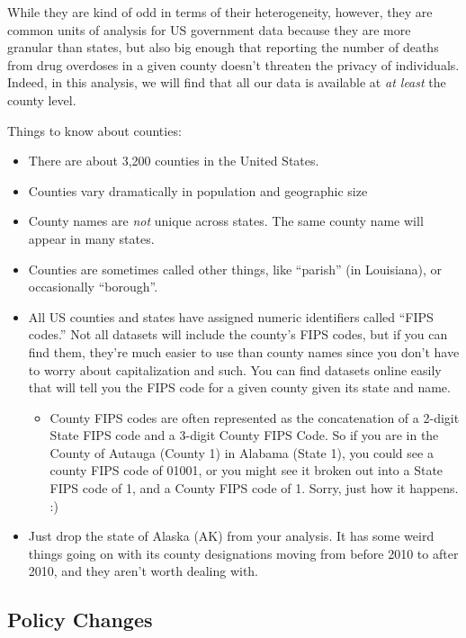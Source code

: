 \documentclass[12pt]{article}
\begin{document}
While they are kind of odd in terms of their heterogeneity, however, they are common units of analysis for US government data because they are more granular than states, but also big enough that reporting the number of deaths from drug overdoses in a given county doesn't threaten the privacy of individuals. Indeed, in this analysis, we will find that all our data is available at \emph{at least} the county level.

Things to know about counties:

\begin{itemize}
  \item There are about 3,200 counties in the United States.
  \item Counties vary dramatically in population and geographic size
  \item County names are \emph{not} unique across states. The same county name will appear in many states.
  \item Counties are sometimes called other things, like ``parish'' (in Louisiana), or occasionally ``borough''.
  \item All US counties and states have assigned numeric identifiers called ``FIPS codes.'' Not all datasets will include the county's FIPS codes, but if you can find them, they're much easier to use than county names since you don't have to worry about capitalization and such. You can find datasets online easily that will tell you the FIPS code for a given county given its state and name.
  \begin{itemize}
    \item County FIPS codes are often represented as the concatenation of a 2-digit State FIPS code and a 3-digit County FIPS Code. So if you are in the County of Autauga (County 1) in Alabama (State 1), you could see a county FIPS code of 01001, or you might see it broken out into a State FIPS code of 1, and a County FIPS code of 1. Sorry, just how it happens. :)
  \end{itemize}
  \item Just drop the state of Alaska (AK) from your analysis. It has some weird things going on with its county designations moving from before 2010 to after 2010, and they aren't worth dealing with.
\end{itemize}

\subsection*{Policy Changes}
\end{document}

